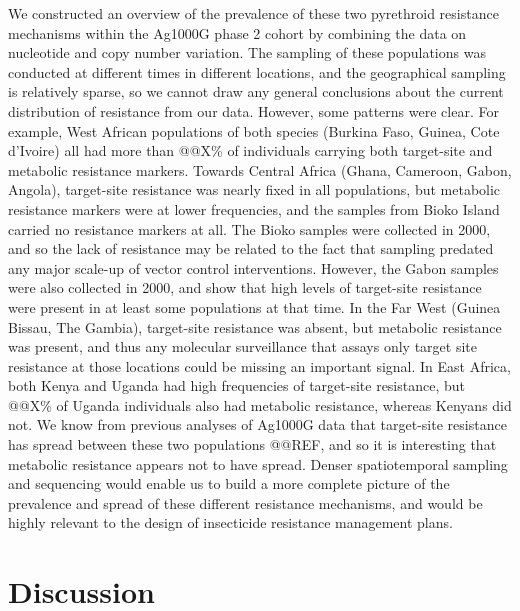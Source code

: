 \documentclass[a4paper,11pt,abstracton,hidelinks]{scrartcl}
\begin{document}
We constructed an overview of the prevalence of these two pyrethroid resistance mechanisms within the Ag1000G phase 2 cohort by combining the data on nucleotide and copy number variation.
%
The sampling of these populations was conducted at different times in different locations, and the geographical sampling is relatively sparse, so we cannot draw any general conclusions about the current distribution of resistance from our data.
%
However, some patterns were clear.
%
For example, West African populations of both species (Burkina Faso, Guinea, Cote d'Ivoire) all had more than @@X\% of individuals carrying both target-site and metabolic resistance markers.
%
Towards Central Africa (Ghana, Cameroon, Gabon, Angola), target-site resistance was nearly fixed in all populations, but metabolic resistance markers were at lower frequencies, and the samples from Bioko Island carried no resistance markers at all.
%
The Bioko samples were collected in 2000, and so the lack of resistance may be related to the fact that sampling predated any major scale-up of vector control interventions.
%
However, the Gabon samples were also collected in 2000, and show that high levels of target-site resistance were present in at least some populations at that time.
%
In the Far West (Guinea Bissau, The Gambia), target-site resistance was absent, but metabolic resistance was present, and thus any molecular surveillance that assays only target site resistance at those locations could be missing an important signal.
%
In East Africa, both Kenya and Uganda had high frequencies of target-site resistance, but @@X\% of Uganda individuals also had metabolic resistance, whereas Kenyans did not.
%
We know from previous analyses of Ag1000G data that target-site resistance has spread between these two populations @@REF, and so it is interesting that metabolic resistance appears not to have spread.
%
Denser spatiotemporal sampling and sequencing would enable us to build a more complete picture of the prevalence and spread of these different resistance mechanisms, and would be highly relevant to the design of insecticide resistance management plans.



\section*{Discussion}
\end{document}

